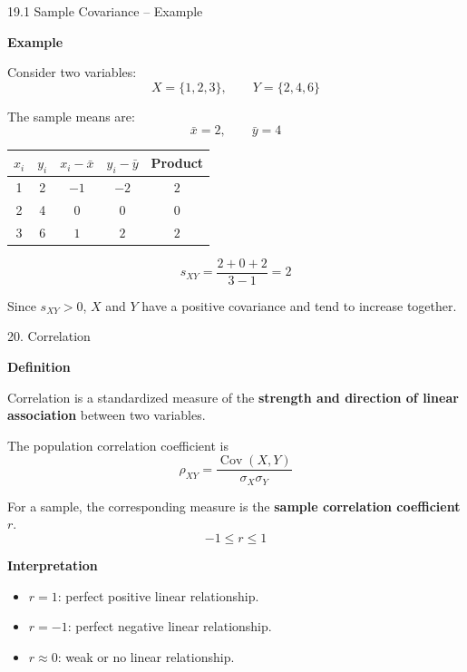 \begin{frame}{19.1 Sample Covariance -- Example}

\textbf{Example}

Consider two variables:
\[
X=\{1,2,3\},
\qquad
Y=\{2,4,6\}
\]

The sample means are:
\[
\bar{x}=2,
\qquad
\bar{y}=4
\]

\begin{table}
\centering
\small

\begin{tabular}{c c c c c}
\toprule
$x_i$ & $y_i$ & $x_i-\bar{x}$ & $y_i-\bar{y}$ &
Product \\
\midrule
1 & 2 & $-1$ & $-2$ & $2$ \\
2 & 4 & $0$ & $0$ & $0$ \\
3 & 6 & $1$ & $2$ & $2$ \\
\bottomrule
\end{tabular}

\end{table}
\[
s_{XY}
=
\frac{2+0+2}{3-1}
=
\boxed{2}
\]

Since $s_{XY}>0$, $X$ and $Y$ have a positive covariance
and tend to increase together.

\end{frame}


\begin{frame}{20. Correlation}

\textbf{Definition}

Correlation is a standardized measure of the
\textbf{strength and direction of linear association}
between two variables.

\vspace{0.1cm}

The population correlation coefficient is
\[
\boxed{
\rho_{XY}
=
\frac{\operatorname{Cov}(X,Y)}
{\sigma_X\sigma_Y}
}
\]

For a sample, the corresponding measure is the
\textbf{sample correlation coefficient} $r$.
\[
\boxed{
-1\leq r\leq1
}
\]

\textbf{Interpretation}

\begin{itemize}
    \item $r=1$: perfect positive linear relationship.
    \item $r=-1$: perfect negative linear relationship.
    \item $r\approx0$: weak or no linear relationship.
\end{itemize}

\end{frame}


